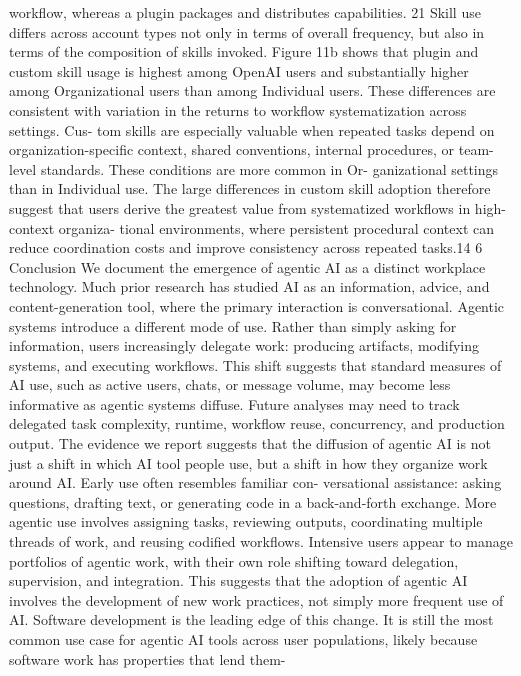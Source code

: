 workflow, whereas a plugin packages and distributes capabilities.
21
Skill use differs across account types not only in terms of overall frequency, but also in terms of the
composition of skills invoked. Figure 11b shows that plugin and custom skill usage is highest among
OpenAI users and substantially higher among Organizational users than among Individual users. These
differences are consistent with variation in the returns to workflow systematization across settings. Cus-
tom skills are especially valuable when repeated tasks depend on organization-specific context, shared
conventions, internal procedures, or team-level standards. These conditions are more common in Or-
ganizational settings than in Individual use. The large differences in custom skill adoption therefore
suggest that users derive the greatest value from systematized workflows in high-context organiza-
tional environments, where persistent procedural context can reduce coordination costs and improve
consistency across repeated tasks.14
6
Conclusion
We document the emergence of agentic AI as a distinct workplace technology. Much prior research
has studied AI as an information, advice, and content-generation tool, where the primary interaction
is conversational. Agentic systems introduce a different mode of use. Rather than simply asking for
information, users increasingly delegate work: producing artifacts, modifying systems, and executing
workflows. This shift suggests that standard measures of AI use, such as active users, chats, or message
volume, may become less informative as agentic systems diffuse. Future analyses may need to track
delegated task complexity, runtime, workflow reuse, concurrency, and production output.
The evidence we report suggests that the diffusion of agentic AI is not just a shift in which AI tool
people use, but a shift in how they organize work around AI. Early use often resembles familiar con-
versational assistance: asking questions, drafting text, or generating code in a back-and-forth exchange.
More agentic use involves assigning tasks, reviewing outputs, coordinating multiple threads of work,
and reusing codified workflows. Intensive users appear to manage portfolios of agentic work, with
their own role shifting toward delegation, supervision, and integration. This suggests that the adoption
of agentic AI involves the development of new work practices, not simply more frequent use of AI.
Software development is the leading edge of this change. It is still the most common use case for
agentic AI tools across user populations, likely because software work has properties that lend them-
